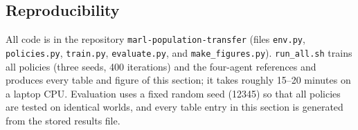\subsection{Reproducibility}
\label{sec:pt-repro}
All code is in the repository \texttt{marl-population-transfer} (files \texttt{env.py}, \texttt{policies.py},
\texttt{train.py}, \texttt{evaluate.py}, and \texttt{make\_figures.py}).
\texttt{run\_all.sh} trains all policies (three seeds, 400 iterations) and the four-agent references and produces
every table and figure of this section; it takes roughly 15--20 minutes on a laptop CPU. Evaluation uses a fixed
random seed (12345) so that all policies are tested on identical worlds, and every table entry in this section is
generated from the stored results file.
